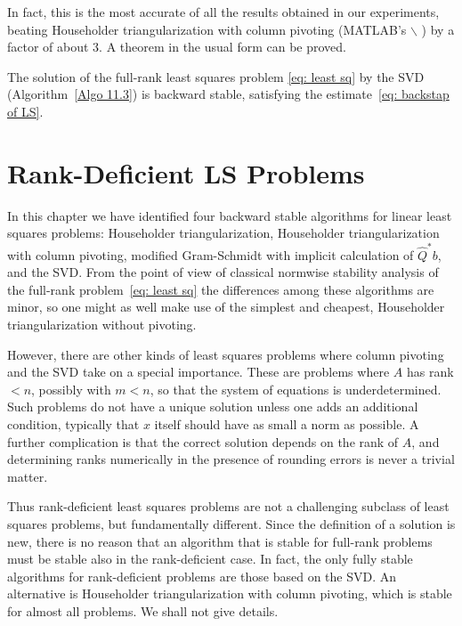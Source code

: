 In fact, this is the most accurate of all the results obtained in our experiments, beating Householder triangularization with column pivoting (MATLAB's $\backslash$ ) by a factor of about 3. A theorem in the usual form can be proved.


\begin{theorem}
\label{thm: Backstap of SVD}
The solution of the full-rank least squares problem \eqref{eq: least sq} by the SVD (Algorithm~\ref{Algo 11.3}) is backward stable, satisfying the estimate~\eqref{eq: backstap of LS}.
\end{theorem}

\section{Rank-Deficient LS Problems} 
In this chapter we have identified four backward stable algorithms for linear least squares problems: Householder triangularization, Householder triangularization with column pivoting, modified Gram-Schmidt with implicit calculation of $\hat{Q}^* b$, and the SVD. From the point of view of classical normwise stability analysis of the full-rank problem~\ref{eq: least sq} the differences among these algorithms are minor, so one might as well make use of the simplest and cheapest, Householder triangularization without pivoting.

However, there are other kinds of least squares problems where column pivoting and the SVD take on a special importance. These are problems where $A$ has rank $<n$, possibly with $m<n$, so that the system of equations is underdetermined. Such problems do not have a unique solution unless one adds an additional condition, typically that $x$ itself should have as small a norm as possible. A further complication is that the correct solution depends on the rank of $A$, and determining ranks numerically in the presence of rounding errors is never a trivial matter.

Thus rank-deficient least squares problems are not a challenging subclass of least squares problems, but fundamentally different. Since the definition of a solution is new, there is no reason that an algorithm that is stable for full-rank problems must be stable also in the rank-deficient case. In fact, the only fully stable algorithms for rank-deficient problems are those based on the SVD. An alternative is Householder triangularization with column pivoting, which is stable for almost all problems. We shall not give details.